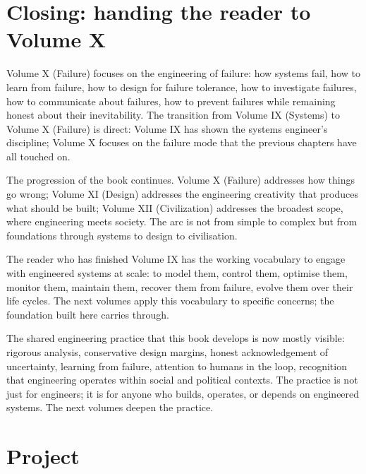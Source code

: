 \section{Closing: handing the reader to Volume X}

Volume X (Failure) focuses on the engineering of failure: how systems fail, how to learn from failure, how to design for failure tolerance, how to investigate failures, how to communicate about failures, how to prevent failures while remaining honest about their inevitability. The transition from Volume IX (Systems) to Volume X (Failure) is direct: Volume IX has shown the systems engineer's discipline; Volume X focuses on the failure mode that the previous chapters have all touched on.

The progression of the book continues. Volume X (Failure) addresses how things go wrong; Volume XI (Design) addresses the engineering creativity that produces what should be built; Volume XII (Civilization) addresses the broadest scope, where engineering meets society. The arc is not from simple to complex but from foundations through systems to design to civilisation.

The reader who has finished Volume IX has the working vocabulary to engage with engineered systems at scale: to model them, control them, optimise them, monitor them, maintain them, recover them from failure, evolve them over their life cycles. The next volumes apply this vocabulary to specific concerns; the foundation built here carries through.

The shared engineering practice that this book develops is now mostly visible: rigorous analysis, conservative design margins, honest acknowledgement of uncertainty, learning from failure, attention to humans in the loop, recognition that engineering operates within social and political contexts. The practice is not just for engineers; it is for anyone who builds, operates, or depends on engineered systems. The next volumes deepen the practice.

\section{Project}


